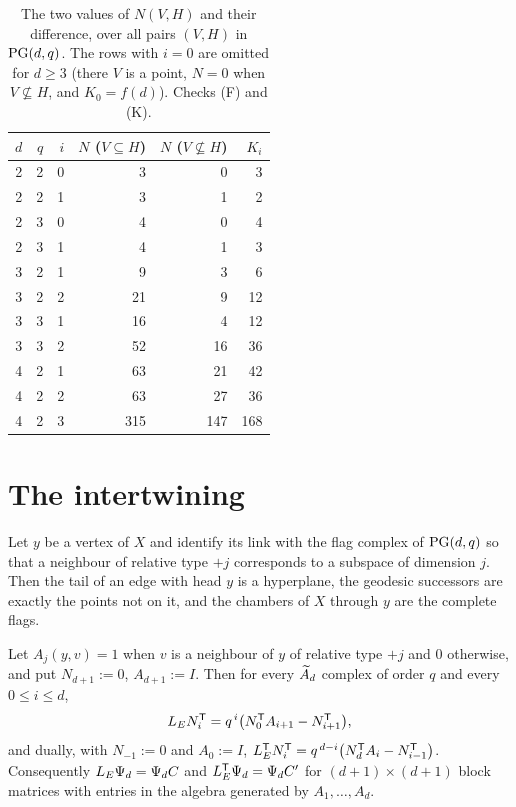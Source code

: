 \begin{table}[t]
\centering
\begin{tabular}{rrrrrr}
\toprule
$d$ & $q$ & $i$ & $N$ ($V\subseteq H$) & $N$ ($V\not\subseteq H$) & $K_i$\\
\midrule
2 & 2 & 0 &   3 &   0 &   3\\
2 & 2 & 1 &   3 &   1 &   2\\
2 & 3 & 0 &   4 &   0 &   4\\
2 & 3 & 1 &   4 &   1 &   3\\
3 & 2 & 1 &   9 &   3 &   6\\
3 & 2 & 2 &  21 &   9 &  12\\
3 & 3 & 1 &  16 &   4 &  12\\
3 & 3 & 2 &  52 &  16 &  36\\
4 & 2 & 1 &  63 &  21 &  42\\
4 & 2 & 2 &  63 &  27 &  36\\
4 & 2 & 3 & 315 & 147 & 168\\
\bottomrule
\end{tabular}
\caption{The two values of $N(V,H)$ and their difference, over all pairs $(V,H)$ in
$\mathrm{PG}(d,q)$. The rows with $i=0$ are omitted for $d\ge3$ (there $V$ is a point, $N=0$ when
$V\not\subseteq H$, and $K_0=f(d)$). Checks (F) and (K).}
\label{XX:tab:flag}
\end{table}

\section{The intertwining}

\begin{lemma}\label{XX:lem:link}
Let $y$ be a vertex of $X$ and identify its link with the flag complex of $\mathrm{PG}(d,q)$ so that
a neighbour of relative type $+j$ corresponds to a subspace of dimension $j$. Then the tail
of an edge with head $y$ is a hyperplane, the geodesic successors are exactly the points not
on it, and the chambers of $X$ through $y$ are the complete flags.
\end{lemma}

\begin{theorem}\label{XX:thm:inter}
Let $A_j(y,v)=1$ when $v$ is a neighbour of $y$ of relative type $+j$ and $0$ otherwise, and
put $N_{d+1}:=0$, $A_{d+1}:=I$. Then for every $\widetilde A_{d}$ complex of order $q$ and every
$0\le i\le d$,
\begin{equation}\label{XX:eq:rec}
  L_E N_i^{\mathsf{T}}=q^{\,i}\bigl(N_0^{\mathsf{T}}A_{i+1}-N_{i+1}^{\mathsf{T}}\bigr),
\end{equation}
and dually, with $N_{-1}:=0$ and $A_0:=I$,
$L_E^{\mathsf{T}}N_i^{\mathsf{T}}=q^{\,d-i}\bigl(N_d^{\mathsf{T}}A_{i}-N_{i-1}^{\mathsf{T}}\bigr)$.
Consequently $L_E\Psi_d=\Psi_dC$ and $L_E^{\mathsf{T}}\Psi_d=\Psi_dC'$ for $(d{+}1)\times(d{+}1)$
block matrices with entries in the algebra generated by $A_1,\dots,A_d$.
\end{theorem}

